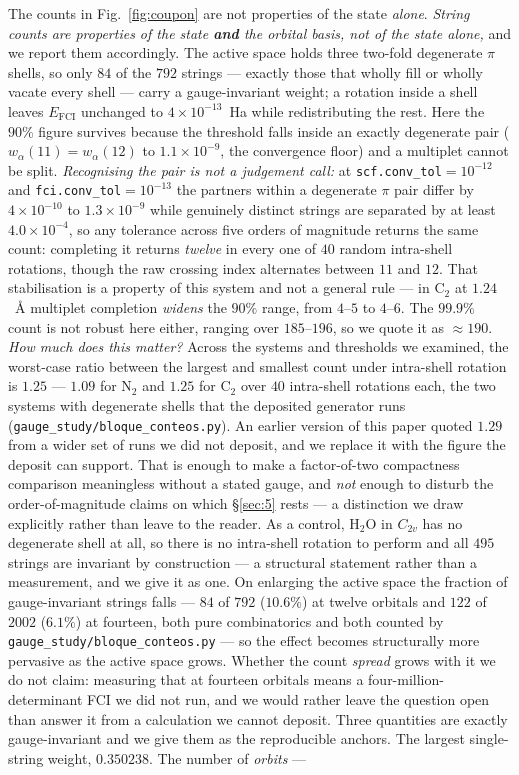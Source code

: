 \documentclass[onecolumn,a4paper]{quantumarticle}
\begin{document}
The counts in Fig.~\ref{fig:coupon} are not properties of the state \emph{alone}. \emph{String counts are properties of the state \textbf{and} the orbital basis, not of the state alone,} and we report them accordingly. The active space holds three two-fold degenerate $\pi$ shells, so only $84$ of the $792$ strings --- exactly those that wholly fill or wholly vacate every shell --- carry a gauge-invariant weight; a rotation inside a shell leaves $E_{\mathrm{FCI}}$ unchanged to $4\times10^{-13}$~Ha while redistributing the rest. Here the $90\%$ figure survives because the threshold falls inside an exactly degenerate pair ($w_\alpha(11)=w_\alpha(12)$ to $1.1\times10^{-9}$, the convergence floor) and a multiplet cannot be split. \emph{Recognising the pair is not a judgement call:} at \texttt{scf.conv\_tol}${=}10^{-12}$ and \texttt{fci.conv\_tol}${=}10^{-13}$ the partners within a degenerate $\pi$ pair differ by $4\times10^{-10}$ to $1.3\times10^{-9}$ while genuinely distinct strings are separated by at least $4.0\times10^{-4}$, so any tolerance across five orders of magnitude returns the same count: completing it returns \emph{twelve} in every one of $40$ random intra-shell rotations, though the raw crossing index alternates between $11$ and $12$. That stabilisation is a property of this system and not a general rule --- in C$_2$ at $1.24$~\AA{} multiplet completion \emph{widens} the $90\%$ range, from $4$--$5$ to $4$--$6$. The $99.9\%$ count is not robust here either, ranging over $185$--$196$, so we quote it as ${\approx}190$. \emph{How much does this matter?} Across the systems and thresholds we examined, the worst-case ratio between the largest and smallest count under intra-shell rotation is $1.25$ --- $1.09$ for N$_2$ and $1.25$ for C$_2$ over $40$ intra-shell rotations each, the two systems with degenerate shells that the deposited generator runs (\texttt{gauge\_study/bloque\_conteos.py}). An earlier version of this paper quoted $1.29$ from a wider set of runs we did not deposit, and we replace it with the figure the deposit can support. That is enough to make a factor-of-two compactness comparison meaningless without a stated gauge, and \emph{not} enough to disturb the order-of-magnitude claims on which \S\ref{sec:5} rests --- a distinction we draw explicitly rather than leave to the reader. As a control, H$_2$O in $C_{2v}$ has no degenerate shell at all, so there is no intra-shell rotation to perform and all $495$ strings are invariant by construction --- a structural statement rather than a measurement, and we give it as one. On enlarging the active space the fraction of gauge-invariant strings falls --- $84$ of $792$ ($10.6\%$) at twelve orbitals and $122$ of $2002$ ($6.1\%$) at fourteen, both pure combinatorics and both counted by \texttt{gauge\_study/bloque\_conteos.py} --- so the effect becomes structurally more pervasive as the active space grows. Whether the count \emph{spread} grows with it we do not claim: measuring that at fourteen orbitals means a four-million-determinant FCI we did not run, and we would rather leave the question open than answer it from a calculation we cannot deposit. Three quantities are exactly gauge-invariant and we give them as the reproducible anchors. The largest single-string weight, $0.350238$. The number of \emph{orbits} --- 
\end{document}

